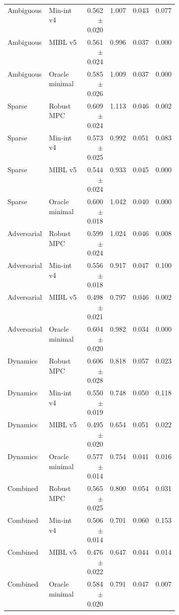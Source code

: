 \documentclass{article}
\begin{document}
\begin{center}
\begin{longtable}{p{0.15\linewidth}p{0.25\linewidth}rrrr}
Ambiguous & Min-int v4 & 0.562 $\pm$ 0.020 & 1.007 & 0.043 & 0.077\\
Ambiguous & MIBL v5 & 0.561 $\pm$ 0.024 & 0.996 & 0.037 & 0.000\\
Ambiguous & Oracle minimal & 0.585 $\pm$ 0.026 & 1.009 & 0.037 & 0.000\\
Sparse & Robust MPC & 0.609 $\pm$ 0.024 & 1.113 & 0.046 & 0.002\\
Sparse & Min-int v4 & 0.573 $\pm$ 0.025 & 0.992 & 0.051 & 0.083\\
Sparse & MIBL v5 & 0.544 $\pm$ 0.024 & 0.933 & 0.045 & 0.000\\
Sparse & Oracle minimal & 0.600 $\pm$ 0.018 & 1.042 & 0.040 & 0.000\\
Adversarial & Robust MPC & 0.599 $\pm$ 0.024 & 1.024 & 0.046 & 0.008\\
Adversarial & Min-int v4 & 0.556 $\pm$ 0.018 & 0.917 & 0.047 & 0.100\\
Adversarial & MIBL v5 & 0.498 $\pm$ 0.021 & 0.797 & 0.046 & 0.002\\
Adversarial & Oracle minimal & 0.604 $\pm$ 0.020 & 0.982 & 0.034 & 0.000\\
Dynamics & Robust MPC & 0.606 $\pm$ 0.028 & 0.818 & 0.057 & 0.023\\
Dynamics & Min-int v4 & 0.550 $\pm$ 0.019 & 0.748 & 0.050 & 0.118\\
Dynamics & MIBL v5 & 0.495 $\pm$ 0.020 & 0.654 & 0.051 & 0.022\\
Dynamics & Oracle minimal & 0.577 $\pm$ 0.014 & 0.754 & 0.041 & 0.016\\
Combined & Robust MPC & 0.565 $\pm$ 0.025 & 0.800 & 0.054 & 0.031\\
Combined & Min-int v4 & 0.506 $\pm$ 0.014 & 0.701 & 0.060 & 0.153\\
Combined & MIBL v5 & 0.476 $\pm$ 0.022 & 0.647 & 0.044 & 0.014\\
Combined & Oracle minimal & 0.584 $\pm$ 0.020 & 0.791 & 0.047 & 0.007\\
\bottomrule
\end{longtable}
\normalsize
\end{center}
\end{document}
